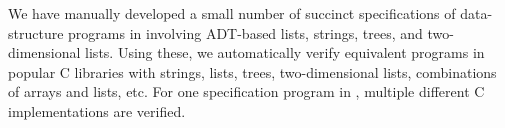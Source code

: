 
We have manually
developed a small
number of succinct specifications of data-structure
programs in \SpecL{}
involving ADT-based
lists, strings, trees, and two-dimensional lists.
Using these,
we automatically verify
equivalent programs in
popular C libraries with
strings, lists, trees, two-dimensional lists,
combinations of arrays and lists, etc.
For one specification program in \SpecL{}, multiple
different C
implementations are verified.
